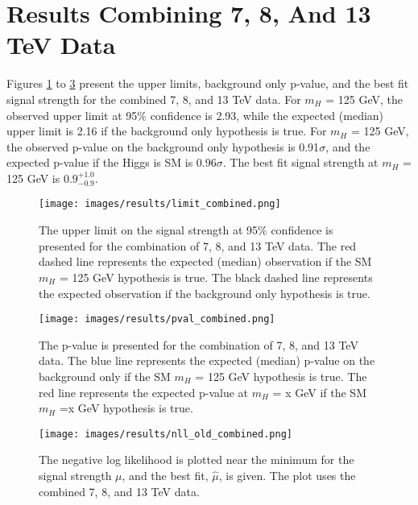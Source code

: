 \section{Results Combining 7, 8, And 13 TeV Data}
Figures \ref{fig:limit7813} to \ref{fig:signalstrength7813} present the upper limits, background only p-value, and the best fit signal strength for the combined 7, 8, and 13 TeV data. For $m_H$ = 125 GeV, the observed upper limit at 95\% confidence is 2.93, while the expected (median) upper limit is 2.16 if the background only hypothesis is true. For $m_H$ = 125 GeV, the observed p-value on the background only hypothesis is 0.91$\sigma$, and the expected p-value if the Higgs is SM is 0.96$\sigma$. The best fit signal strength at $m_H$ = 125 GeV is $0.9^{+1.0}_{-0.9}$. 
\begin{figure}[h!]
    \centering
    \texttt{[image: images/results/limit\_combined.png]}
    \caption[The upper limit on the signal strength combining 7, 8, and 13 TeV data.]
    {The upper limit on the signal strength at 95\% confidence is presented for the combination of 7, 8, and 13 TeV data. The red dashed line represents the expected (median) observation if the SM $m_H$ = 125 GeV hypothesis is true. The black dashed line represents the expected observation if the background only hypothesis is true.}
    \label{fig:limit7813}
\end{figure}
\begin{figure}[h!]
    \centering
    \texttt{[image: images/results/pval\_combined.png]}
    \caption[The p-value on the background only hypothesis combining 7, 8, and 13 TeV data.]
    {The p-value is presented for the combination of 7, 8, and 13 TeV data. The blue line represents the expected (median) p-value on the background only if the SM $m_H$ = 125 GeV hypothesis is true. The red line represents the expected p-value at $m_H$ = x GeV if the SM $m_H$ =x GeV hypothesis is true.}
    \label{fig:pval7813}
\end{figure}
\begin{figure}[h!]
    \centering
    \texttt{[image: images/results/nll\_old\_combined.png]}
    \caption[The negative log likelihood for the combined 7, 8, and 13 TeV data.]
    {The negative log likelihood is plotted near the minimum for the signal strength $\mu$, and the best fit, $\hat{\mu}$, is given. The plot uses the combined 7, 8, and 13 TeV data.}
    \label{fig:signalstrength7813}
\end{figure}
